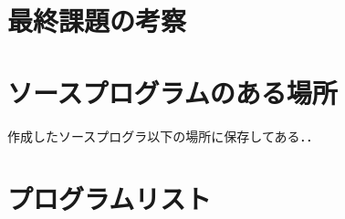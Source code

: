 \documentclass[a4paper,11pt]{jarticle}
\begin{document}
{%
\section{最終課題の考察}

\section{ソースプログラムのある場所}

作成したソースプログラ以下の場所に保存してある．．

\section{プログラムリスト}
{\fontsize{10pt}{11pt} \selectfont
\begin{verbatim}

\end{verbatim}
}

}
\end{document}

